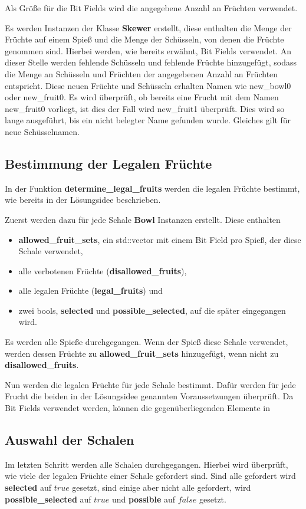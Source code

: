 \documentclass[a4paper,10pt,ngerman]{scrartcl}
\begin{document}
Als Größe für die Bit Fields wird die angegebene Anzahl an Früchten verwendet.

\medskip
Es werden Instanzen der Klasse \textbf{Skewer} erstellt, diese enthalten die Menge der Früchte auf einem Spieß und die Menge der Schüsseln, von denen die Früchte genommen sind.
Hierbei werden, wie bereits erwähnt, Bit Fields verwendet.
An dieser Stelle werden fehlende Schüsseln und fehlende Früchte hinzugefügt, sodass die Menge an Schüsseln und Früchten der angegebenen Anzahl an Früchten entspricht.
Diese neuen Früchte und Schüsseln erhalten Namen wie \glqq new\_bowl0\grqq{} oder \glqq new\_fruit0\grqq{}.
Es wird überprüft, ob bereits eine Frucht mit dem Namen \glqq new\_fruit0\grqq{} vorliegt, ist dies der Fall wird \glqq new\_fruit1\grqq{} überprüft.
Dies wird so lange ausgeführt, bis ein nicht belegter Name gefunden wurde.
Gleiches gilt für neue Schüsselnamen.

\subsection{Bestimmung der Legalen Früchte}
In der Funktion \textbf{determine\_legal\_fruits} werden die legalen Früchte bestimmt, wie bereits in der Lösungsidee beschrieben.

Zuerst werden dazu für jede Schale \textbf{Bowl} Instanzen erstellt.
Diese enthalten
\begin{itemize}
    \item \textbf{allowed\_fruit\_sets}, ein std::vector mit einem Bit Field pro Spieß, der diese Schale verwendet,
    \item alle verbotenen Früchte (\textbf{disallowed\_fruits}),
    \item alle legalen Früchte (\textbf{legal\_fruits}) und
    \item zwei bools, \textbf{selected} und \textbf{possible\_selected}, auf die später eingegangen wird.
\end{itemize}
Es werden alle Spieße durchgegangen.
Wenn der Spieß diese Schale verwendet, werden dessen Früchte zu \textbf{allowed\_fruit\_sets} hinzugefügt, wenn nicht zu \textbf{disallowed\_fruits}.

Nun werden die legalen Früchte für jede Schale bestimmt.
Dafür werden für jede Frucht die beiden in der Lösungsidee genannten Voraussetzungen überprüft.
Da Bit Fields verwendet werden, können die gegenüberliegenden Elemente in

\subsection{Auswahl der Schalen}
Im letzten Schritt werden alle Schalen durchgegangen.
Hierbei wird überprüft, wie viele der legalen Früchte einer Schale gefordert sind.
Sind alle gefordert wird \textbf{selected} auf $true$ gesetzt, sind einige aber nicht alle gefordert, wird \textbf{possible\_selected} auf $true$ und \textbf{possible} auf $false$ gesetzt.
\end{document}
